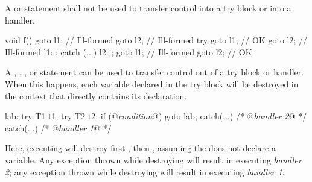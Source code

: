 \pnum
{}%
%
%
%
%
%
A  or  statement shall not be used to transfer control
into a try block or into a handler.
\begin{example}
\begin{codeblock}
void f() {
  goto l1;          // Ill-formed
  goto l2;          // Ill-formed
  try {
    goto l1;        // OK
    goto l2;        // Ill-formed
    l1: ;
  } catch (...) {
    l2: ;
    goto l1;        // Ill-formed
    goto l2;        // OK
  }
}

\end{codeblock}
\end{example}
%
%
%
%
%
%
%
%
A
,
,
,
or
statement can be used to transfer control out of
a try block or handler.
When this happens, each variable declared in the try block
will be destroyed in the context that
directly contains its declaration.
\begin{example}

\begin{codeblock}
lab:  try {
  T1 t1;
  try {
    T2 t2;
    if (@\textit{condition}@)
      goto lab;
    } catch(...) { /* @\textit{handler 2}@ */ }
  } catch(...) { /* @\textit{handler 1}@ */ }
\end{codeblock}

Here, executing
will destroy first
,
then
,
assuming the
does not declare a variable.
Any exception thrown while destroying
will result in executing
\textit{handler 2};
any exception thrown while destroying
will result in executing
\textit{handler 1}.
\end{example}


